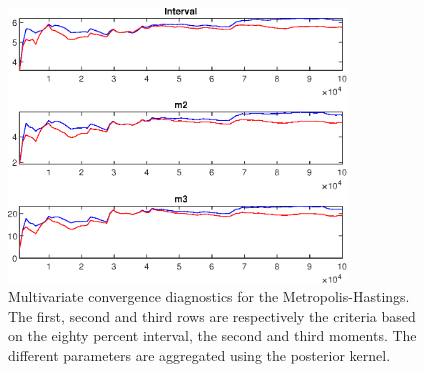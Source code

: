  
\begin{figure}[H]
\centering 
\includegraphics[width=0.8\textwidth]{BRS_pred_labor/Output/BRS_pred_labor_mdiag}
\caption{Multivariate convergence diagnostics for the Metropolis-Hastings.
The first, second and third rows are respectively the criteria based on
the eighty percent interval, the second and third moments. The different 
parameters are aggregated using the posterior kernel.}\label{Fig:MultivariateDiagnostics}
\end{figure}


